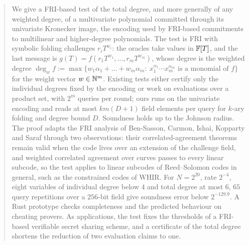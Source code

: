 \begin{abstract}
We give a FRI-based test of the total degree, and more generally of any weighted degree, of
a multivariate polynomial committed through its univariate Kronecker image, the encoding
used by FRI-based commitments to multilinear and higher-degree polynomials. The test is FRI
with symbolic folding challenges $r_iT^{w_i}$: the oracles take values in $\F[T]$, and the
last message is $g(T)=f(r_1T^{w_1},\dots,r_mT^{w_m})$, whose degree is the weighted degree
$\deg_wf:=\max\{w_1\alpha_1+\dots+w_m\alpha_m:\ x_1^{\alpha_1}\cdots x_m^{\alpha_m}\text{ is a monomial of }f\}$
for the weight vector $w\in\N^m$. Existing tests either certify only the individual degrees fixed by the encoding or
work on evaluations over a product set, with $2^m$ queries per round; ours runs on the
univariate encoding and reads at most $km(D+1)$ field elements per query for $k$-ary folding
and degree bound $D$. Soundness holds up to the Johnson radius. The proof adapts the FRI
analysis of Ben-Sasson, Carmon, Ishai, Kopparty and Saraf through two observations: their
correlated-agreement theorems remain valid when the code lives over an extension of the
challenge field, and weighted correlated agreement over curves passes to every linear
subcode, so the test applies to linear subcodes of Reed--Solomon codes in general, such as the
constrained codes of WHIR. For $N=2^{20}$, rate $2^{-4}$, eight variables of individual degree below $4$ and
total degree at most $6$, $65$ query repetitions over a $256$-bit field give soundness error
below $2^{-129.9}$. A Rust prototype checks completeness and the predicted behaviour on
cheating provers. As applications, the test fixes the thresholds of a FRI-based verifiable secret
sharing scheme, and a certificate of the total degree shortens the reduction of two evaluation
claims to one.
\end{abstract}
